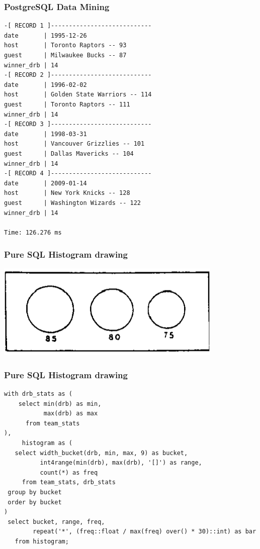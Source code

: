\documentclass{beamer}
\begin{document}
\begin{frame}[fragile]
  \frametitle{PostgreSQL Data Mining}

\begin{verbatim}
-[ RECORD 1 ]----------------------------
date       | 1995-12-26
host       | Toronto Raptors -- 93
guest      | Milwaukee Bucks -- 87
winner_drb | 14
-[ RECORD 2 ]----------------------------
date       | 1996-02-02
host       | Golden State Warriors -- 114
guest      | Toronto Raptors -- 111
winner_drb | 14
-[ RECORD 3 ]----------------------------
date       | 1998-03-31
host       | Vancouver Grizzlies -- 101
guest      | Dallas Mavericks -- 104
winner_drb | 14
-[ RECORD 4 ]----------------------------
date       | 2009-01-14
host       | New York Knicks -- 128
guest      | Washington Wizards -- 122
winner_drb | 14

Time: 126.276 ms
\end{verbatim}
\end{frame}

\begin{frame}
  \frametitle{Pure SQL Histogram drawing}

  \begin{center}
    \includegraphics[height=1.8in]{histogram.png}
  \end{center}
\end{frame}

\begin{frame}[fragile]
  \frametitle{Pure SQL Histogram drawing}
  
  \begin{verbatim}
with drb_stats as (
    select min(drb) as min,
           max(drb) as max
      from team_stats
),
     histogram as (
   select width_bucket(drb, min, max, 9) as bucket,
          int4range(min(drb), max(drb), '[]') as range,
          count(*) as freq
     from team_stats, drb_stats
 group by bucket
 order by bucket
)
 select bucket, range, freq,
        repeat('*', (freq::float / max(freq) over() * 30)::int) as bar
   from histogram;
  \end{verbatim}
\end{frame}
\end{document}
